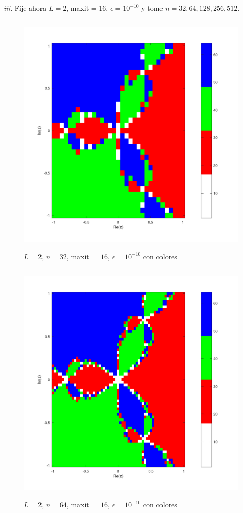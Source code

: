 \documentclass{article} %
\begin{document}
\textit{iii.} Fije ahora $L=2$, maxit = 16,  $\epsilon=10^{-10}$ y tome $n=32,64,128,256,512$.

\begin{figure}[H]
    \centering
    \includegraphics[width=152mm, height=120mm]{images/L2n32maxit16e10-10color.png}
    \caption{$L=2$, $n=32$, maxit $=16$, $\epsilon=10^{-10}$ con colores}
\end{figure}

\begin{figure}[H]
    \centering
    \includegraphics[width=152mm, height=120mm]{images/L2n64maxit16e10-10color.png}
    \caption{$L=2$, $n=64$, maxit $=16$, $\epsilon=10^{-10}$ con colores}
\end{figure}
\end{document}
